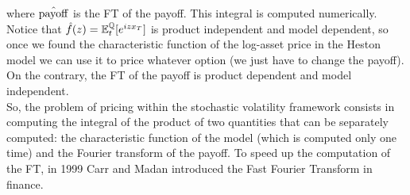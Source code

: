 where $\hat{\operatorname{payoff}}$ is the FT of the payoff. This integral is computed numerically. Notice that $\hat{f}(z) = \mathbb{E}^{\mathbb{Q}}_t[e^{izx_T}]$ is product independent and model dependent, so once we found the characteristic function of the log-asset price in the Heston model we can use it to price whatever option (we just have to change the payoff). On the contrary, the FT of the payoff is product dependent and model independent.\\
So, the problem of pricing within the stochastic volatility framework consists in computing the integral of the product of two quantities that can be separately computed: the characteristic function of the model (which is computed only one time) and the Fourier transform of the payoff. To speed up the computation of the FT, in 1999 Carr and Madan introduced the Fast Fourier Transform in finance.%
